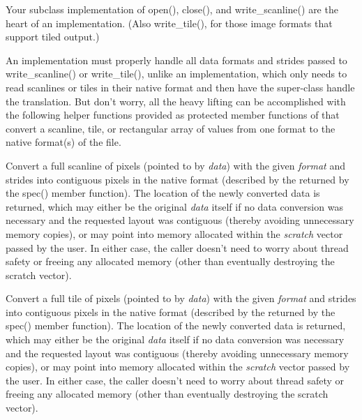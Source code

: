 Your subclass implementation of {\cf open()}, {\cf close()}, and {\cf
  write_scanline()} are the heart of an \ImageOutput implementation.
(Also {\cf write_tile()}, for those image formats that support tiled
output.)

An \ImageOutput implementation must properly handle all data formats and
strides passed to {\cf write_scanline()} or {\cf write_tile()}, unlike
an \ImageInput implementation, which only needs to read scanlines or
tiles in their native format and then have the super-class handle the
translation.  But don't worry, all the heavy lifting can be accomplished
with the following helper functions provided as protected member
functions of \ImageOutput that convert a scanline, tile, or rectangular
array of values from one format to the native format(s) of the file.


Convert a full scanline of pixels (pointed to by \emph{data}) with the
given \emph{format} and strides into contiguous pixels in the native
format (described by the \ImageSpec returned by the {\cf spec()} member
function).  The location of the newly converted data is returned, which
may either be the original \emph{data} itself if no data conversion was
necessary and the requested layout was contiguous (thereby avoiding
unnecessary memory copies), or may point into memory allocated within
the \emph{scratch} vector passed by the user.  In either case, the
caller doesn't need to worry about thread safety or freeing any
allocated memory (other than eventually destroying the scratch vector).
\apiend


Convert a full tile of pixels (pointed to by \emph{data}) with the given
\emph{format} and strides into contiguous pixels in the native format
(described by the \ImageSpec returned by the {\cf spec()} member
function).  The location of the newly converted data is returned, which
may either be the original \emph{data} itself if no data conversion was
necessary and the requested layout was contiguous (thereby avoiding
unnecessary memory copies), or may point into memory allocated within
the \emph{scratch} vector passed by the user.  In either case, the
caller doesn't need to worry about thread safety or freeing any
allocated memory (other than eventually destroying the scratch vector).

